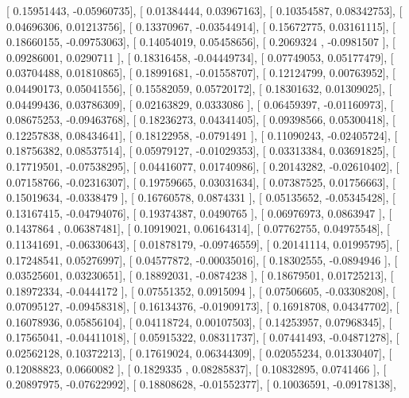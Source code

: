 \documentclass{article}
\begin{document}
       [ 0.15951443, -0.05960735],
       [ 0.01384444,  0.03967163],
       [ 0.10354587,  0.08342753],
       [ 0.04696306,  0.01213756],
       [ 0.13370967, -0.03544914],
       [ 0.15672775,  0.03161115],
       [ 0.18660155, -0.09753063],
       [ 0.14054019,  0.05458656],
       [ 0.2069324 , -0.0981507 ],
       [ 0.09286001,  0.0290711 ],
       [ 0.18316458, -0.04449734],
       [ 0.07749053,  0.05177479],
       [ 0.03704488,  0.01810865],
       [ 0.18991681, -0.01558707],
       [ 0.12124799,  0.00763952],
       [ 0.04490173,  0.05041556],
       [ 0.15582059,  0.05720172],
       [ 0.18301632,  0.01309025],
       [ 0.04499436,  0.03786309],
       [ 0.02163829,  0.0333086 ],
       [ 0.06459397, -0.01160973],
       [ 0.08675253, -0.09463768],
       [ 0.18236273,  0.04341405],
       [ 0.09398566,  0.05300418],
       [ 0.12257838,  0.08434641],
       [ 0.18122958, -0.0791491 ],
       [ 0.11090243, -0.02405724],
       [ 0.18756382,  0.08537514],
       [ 0.05979127, -0.01029353],
       [ 0.03313384,  0.03691825],
       [ 0.17719501, -0.07538295],
       [ 0.04416077,  0.01740986],
       [ 0.20143282, -0.02610402],
       [ 0.07158766, -0.02316307],
       [ 0.19759665,  0.03031634],
       [ 0.07387525,  0.01756663],
       [ 0.15019634, -0.0338479 ],
       [ 0.16760578,  0.0874331 ],
       [ 0.05135652, -0.05345428],
       [ 0.13167415, -0.04794076],
       [ 0.19374387,  0.0490765 ],
       [ 0.06976973,  0.0863947 ],
       [ 0.1437864 ,  0.06387481],
       [ 0.10919021,  0.06164314],
       [ 0.07762755,  0.04975548],
       [ 0.11341691, -0.06330643],
       [ 0.01878179, -0.09746559],
       [ 0.20141114,  0.01995795],
       [ 0.17248541,  0.05276997],
       [ 0.04577872, -0.00035016],
       [ 0.18302555, -0.0894946 ],
       [ 0.03525601,  0.03230651],
       [ 0.18892031, -0.0874238 ],
       [ 0.18679501,  0.01725213],
       [ 0.18972334, -0.0444172 ],
       [ 0.07551352,  0.0915094 ],
       [ 0.07506605, -0.03308208],
       [ 0.07095127, -0.09458318],
       [ 0.16134376, -0.01909173],
       [ 0.16918708,  0.04347702],
       [ 0.16078936,  0.05856104],
       [ 0.04118724,  0.00107503],
       [ 0.14253957,  0.07968345],
       [ 0.17565041, -0.04411018],
       [ 0.05915322,  0.08311737],
       [ 0.07441493, -0.04871278],
       [ 0.02562128,  0.10372213],
       [ 0.17619024,  0.06344309],
       [ 0.02055234,  0.01330407],
       [ 0.12088823,  0.0660082 ],
       [ 0.1829335 ,  0.08285837],
       [ 0.10832895,  0.0741466 ],
       [ 0.20897975, -0.07622992],
       [ 0.18808628, -0.01552377],
       [ 0.10036591, -0.09178138],
\end{document}
